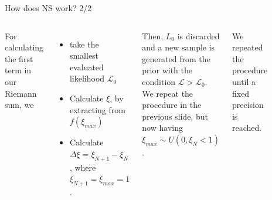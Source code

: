 \documentclass[
10pt,
aspectratio=169,
]{beamer}
\begin{document}
\begin{frame}{How does NS work? 2/2}
\begin{columns}
        For calculating the first term in our Riemann sum, we
        \begin{itemize}
        \item take the smallest evaluated likelihood $\mathcal{L}_{0}$ 
        \item Calculate $\xi$, by extracting from $f(\xi_{max})$
        \item Calculate $\Delta \xi = \xi_{N+1} - \xi_N $, where $\xi_{N+1}=\xi_{max}=1$.\\
        \end{itemize}
        \vspace{0.5cm}
        Then, $L_0$ is discarded and a new sample is generated from the prior with the condition $\mathcal{L}>\mathcal{L}_{0}$. \\We repeat the procedure in the previous slide, but now having $\xi_{max} \sim U(0,\xi_{N}<1)$.     \\
        
\vspace{0.5cm}

        We repeated the procedure until a fixed precision is reached.
        
    \begin{figure}
        \centering
        \includegraphics[width=\columnwidth]{NS_scheme.png}
    \end{figure}
\end{columns}

\end{frame}
\end{document}
